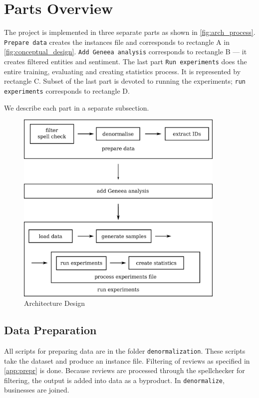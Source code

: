 \section{Parts Overview}

The project is implemented in three separate parts as shown in \autoref{fig:arch_process}.
\texttt{Prepare data} creates the instances file and corresponds to rectangle A in \autoref{fig:conceptual_design}.
\texttt{Add Geneea analysis} corresponds to rectangle B --- it creates filtered entities and sentiment.
The last part \texttt{Run experiments} does the entire training, evaluating and creating statistics process.
It is represented by rectangle C.
Subset of the last part is devoted to running the experiments; \texttt{run experiments} corresponds to rectangle D.

We describe each part in a separate subsection.

\begin{figure}[h]
    \centering
	\includegraphics[width=10cm]{figures/arch_process.eps}
	\caption{Architecture Design}\label{fig:arch_process}
\end{figure}


\subsection{Data Preparation} 

All scripts for preparing data are in the folder \texttt{denormalization}.
These scripts take the dataset and produce an instance file.
Filtering of reviews as specified in \autoref{app:prepr} is done.
Because reviews are processed through the spellchecker for filtering,
the output is added into data as a byproduct.
In \texttt{denormalize}, businesses are joined.

